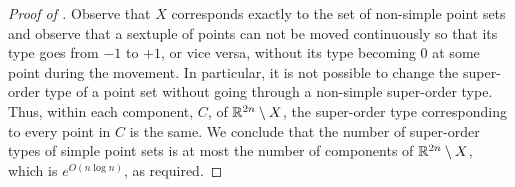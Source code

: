 \documentclass{patmorin}
\begin{document}
\begin{proof}[Proof of ]
   Observe that $X$ corresponds exactly to the set of non-simple
   point sets and observe that a sextuple of points can not be moved
   continuously so that its type goes from $-1$ to $+1$, or vice versa,
   without its type becoming $0$ at some point during the movement.
   In particular, it is not possible to change the super-order type of
   a point set without going through a non-simple super-order type.
   Thus, within each component, $C$, of $\mathbb{R}^{2n}\setminus X$, the
   super-order type corresponding to every point in $C$ is the same.
   We conclude that the number of super-order types of simple point
   sets is at most the number of components of $\mathbb{R}^{2n}\setminus X$,
   which is $e^{O(n\log n)}$, as required.
\end{proof}
\end{document}
